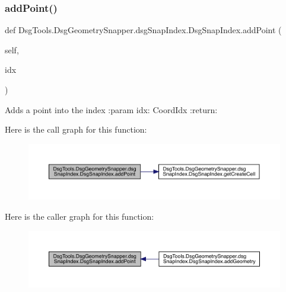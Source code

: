 \subsubsection{\texorpdfstring{add\+Point()}{addPoint()}}
{\footnotesize\ttfamily def Dsg\+Tools.\+Dsg\+Geometry\+Snapper.\+dsg\+Snap\+Index.\+Dsg\+Snap\+Index.\+add\+Point (\begin{DoxyParamCaption}\item[{}]{self,  }\item[{}]{idx }\end{DoxyParamCaption})}

\begin{DoxyVerb}Adds a point into the index
:param idx: CoordIdx
:return:
\end{DoxyVerb}
 Here is the call graph for this function\+:
\nopagebreak
\begin{figure}[H]
\begin{center}
\leavevmode
\includegraphics[width=350pt]{class_dsg_tools_1_1_dsg_geometry_snapper_1_1dsg_snap_index_1_1_dsg_snap_index_a4cf0f03c762bf6ee7bf07c78dfdbb55b_cgraph}
\end{center}
\end{figure}
Here is the caller graph for this function\+:
\nopagebreak
\begin{figure}[H]
\begin{center}
\leavevmode
\includegraphics[width=350pt]{class_dsg_tools_1_1_dsg_geometry_snapper_1_1dsg_snap_index_1_1_dsg_snap_index_a4cf0f03c762bf6ee7bf07c78dfdbb55b_icgraph}
\end{center}
\end{figure}
\mbox{\label{class_dsg_tools_1_1_dsg_geometry_snapper_1_1dsg_snap_index_1_1_dsg_snap_index_a0700c214adf8731c2bc5e473e46fd4b9}} 
